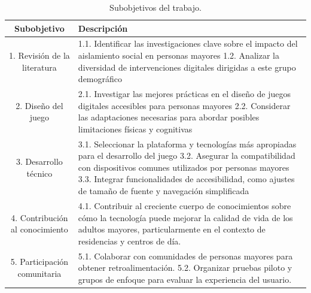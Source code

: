 \begin{table}[ht]
  \centering
  \begin{tabular}{| c | p{9.6cm} |}
    \hline
    \rowcolor{lightgray}
    \textbf{Subobjetivo} & \textbf{Descripción} \\
    \hline
    1. Revisión de la literatura & 
        1.1. Identificar las investigaciones clave sobre el impacto del aislamiento social en personas mayores \newline
        \vspace{0.2cm}
        1.2. Analizar la diversidad de intervenciones digitales dirigidas a este grupo demográfico \vspace{0.2cm} \\
    \hline
    2. Diseño del juego &
        2.1. Investigar las mejores prácticas en el diseño de juegos digitales accesibles para personas mayores \newline
        \vspace{0.2cm}
        2.2. Considerar las adaptaciones necesarias para abordar posibles limitaciones físicas y cognitivas
        \vspace{0.2cm} \\
    \hline
    3. Desarrollo técnico & 
        3.1. Seleccionar la plataforma y tecnologías más apropiadas para el desarrollo del juego \newline
        \vspace{0.2cm}
        3.2. Asegurar la compatibilidad con dispositivos comunes utilizados por personas mayores \newline
        \vspace{0.2cm}
        3.3. Integrar funcionalidades de accesibilidad, como ajustes de tamaño de fuente y navegación simplificada \vspace{0.2cm} \\
    \hline
    4. Contribución al conocimiento & 
    4.1. Contribuir al creciente cuerpo de conocimientos sobre cómo la tecnología puede mejorar la calidad de vida de los adultos mayores, particularmente en el contexto de residencias y centros de día. 
    \vspace{0.2cm} \\
    \hline
    5. Participación comunitaria & 
        5.1. Colaborar con comunidades de personas mayores para obtener retroalimentación. \newline
        \vspace{0.2cm}
        5.2. Organizar pruebas piloto y grupos de enfoque para evaluar la experiencia del usuario. \vspace{0.2cm} \\
    \hline
    \end{tabular}
  \caption{Subobjetivos del trabajo.}
  \label{tab:subobjetivos}
\end{table}